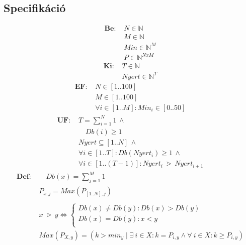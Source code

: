 \documentclass[a4paper]{article}
\begin{document}
    \subsection{Specifikáció}
    \begin{align*}
      \mathbf{Be:}\, &N \in \mathbb{N} \\
      &M \in \mathbb{N} \\
      &Min \in \mathbb{N}^M \\
      &P \in \mathbb{N}^{NxM}
    \end{align*}
    \begin{align*}
      \mathbf{Ki:}\, &T \in \mathbb{N} \\
      &Nyert \in \mathbb{N}^T
    \end{align*}
    \begin{align*}
      \mathbf{EF:}\, &N \in \left [ 1 .. 100 \right ] \\
      &M \in \left [ 1 .. 100 \right ] \\
      &\forall i \in \left [ 1 .. M \right ] : Min_i \in \left [ 0 .. 50 \right ]
    \end{align*}
    \begin{align*}
      \mathbf{UF:}\, &T=\sum_{i=1}^{N}1 \, \wedge \\
      &\quad Db(i) \geqslant 1 \\
      &Nyert \subseteq \left [ 1 .. N \right ] \, \wedge \\
      &\forall i \in \left [ 1 .. T \right ] : Db(Nyert_i) \geqslant 1 \, \wedge \\
      &\forall i \in \left[ 1 .. (T-1) \right ] : Nyert_i \, \gtrdot \, Nyert_{i+1}
    \end{align*}
    \begin{align*}
      \mathbf{Def:}\, &\quad Db(x)=\sum_{j=1}^{M}1   \\
      &P_{x,j}=Max\left(P_{\left [ 1..N \right ],j}\right) \\
      \\
      &x \, \gtrdot \, y \Leftrightarrow \left\{
                \begin{array}{ll}
                  Db(x) \neq Db(y) : Db(x) > Db(y)\\
                  Db(x) = Db(y) : x < y\\
                \end{array}
              \right. \\
      &Max(P_{X,y})=\left (k > min_y\mid \exists \ i\in X: k= P_{i,y} \wedge \forall \ i \in X: k \geqslant P_{i,y} \right )
    \end{align*}
\end{document}
